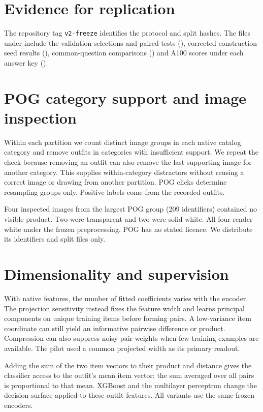 \documentclass[preprint,12pt]{elsarticle}
\begin{document}
\section{Evidence for replication}
The repository tag \texttt{v2-freeze} identifies the protocol and split hashes. The files under  include the validation selections and paired tests (), corrected construction-seed results (), common-question comparisons () and A100 scores under each answer key ().
\section{POG category support and image inspection}\label{sec:pog-support}
Within each partition we count distinct image groups in each native catalog category and remove outfits in categories with insufficient support. We repeat the check because removing an outfit can also remove the last supporting image for another category. This supplies within-category distractors without reusing a correct image or drawing from another partition. POG clicks determine resampling groups only. Positive labels come from the recorded outfits.

Four inspected images from the largest POG group (209 identifiers) contained no visible product. Two were transparent and two were solid white. All four render white under the frozen preprocessing. POG has no stated licence. We distribute its identifiers and split files only.

\section{Dimensionality and supervision}\label{sec:probe-details}
With native features, the number of fitted coefficients varies with the encoder. The projection sensitivity instead fixes the feature width and learns principal components on unique training items before forming pairs. A low-variance item coordinate can still yield an informative pairwise difference or product. Compression can also suppress noisy pair weights when few training examples are available. The pilot used a common projected width as its primary readout.

Adding the sum of the two item vectors to their product and distance gives the classifier access to the outfit's mean item vector: the sum averaged over all pairs is proportional to that mean. XGBoost and the multilayer perceptron change the decision surface applied to these outfit features. All variants use the same frozen encoders.
\end{document}
